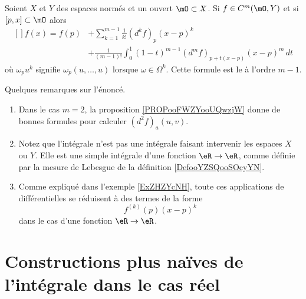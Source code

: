 \begin{proposition}\label{PropAXaSClx}
	Soient \( X\) et \( Y\) des espaces normés et un ouvert \( \mO\subset X\). Si \( f\in C^m(\mO,Y)\) et si \( [p,x]\subset \mO\) alors
	\begin{equation}
		\begin{aligned}[]
			f(x)=f(p) & +\sum_{k=1}^{m-1}\frac{1}{ k! }(d^kf)_p (x-p)^k                      \\
			          & +\frac{1}{ (m-1)! }\int_0^1(1-t)^{m-1}(d^mf)_{ p+t(x-p) }(x-p)^m\,dt
		\end{aligned}
	\end{equation}
	où \( \omega_pu^k\) signifie \( \omega_p(u,\ldots, u)\) lorsque \( \omega\in \Omega^k\). Cette formule est le  à l'ordre \( m-1\).
\end{proposition}

\begin{remark}
	Quelques remarques sur l'énoncé.
	\begin{enumerate}
		\item

		      Dans le cas \( m=2\), la proposition \ref{PROPooFWZYooUQwzjW} donne de bonnes formules pour calculer \( (d^2f)_a(u,v)\).
		\item
		      Notez que l'intégrale n'est pas une intégrale faisant intervenir les espaces \( X\) ou \( Y\). Elle est une simple intégrale d'une fonction \( \eR\to \eR\), comme définie par la mesure de Lebesgue de la définition \ref{DefooYZSQooSOcyYN}.
		\item
		      Comme expliqué dans l'exemple \ref{ExZHZYcNH}, toute ces applications de différentielles se réduisent à des termes de la forme
		      \begin{equation}
			      f^{(k)}(p)(x-p)^k
		      \end{equation}
		      dans le cas d'une fonction \( \eR\to\eR\).
	\end{enumerate}
\end{remark}

\section{Constructions plus naïves de l'intégrale dans le cas réel}


